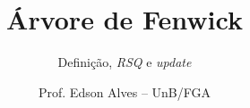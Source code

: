 \title{Árvore de Fenwick}
\subtitle{Definição, \textit{RSQ} e \textit{update}}
\author{Prof. Edson Alves -- UnB/FGA}
\date{}
